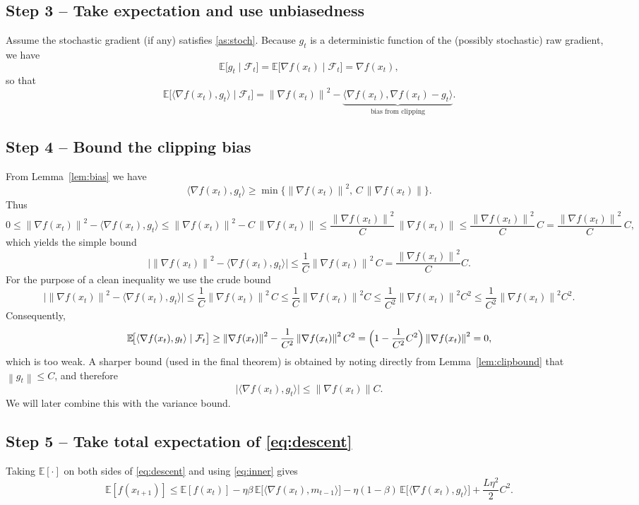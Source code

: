 \documentclass{article}
\newcommand{\E}{\mathbb{E}}
\newcommand{\norm}[1]{\left\lVert#1\right\rVert}
\begin{document}
\subsection*{Step 3 – Take expectation and use unbiasedness}
Assume the stochastic gradient (if any) satisfies \ref{as:stoch}. Because $g_{t}$ is a deterministic function of the (possibly stochastic) raw gradient, we have
\[
\E\!\bigl[g_{t}\mid\mathcal{F}_{t}\bigr]=\E\!\bigl[\nabla f(x_{t})\mid\mathcal{F}_{t}\bigr]=\nabla f(x_{t}),
\]
so that
\[
\E\!\bigl[\langle\nabla f(x_{t}),g_{t}\rangle\mid\mathcal{F}_{t}\bigr]
= \norm{\nabla f(x_{t})}^{2} - \underbrace{\bigl\langle\nabla f(x_{t}),\nabla f(x_{t})-g_{t}\bigr\rangle}_{\text{bias from clipping}}.
\tag{3}\label{eq:expinner}
\]

\subsection*{Step 4 – Bound the clipping bias}
From Lemma~\ref{lem:bias} we have
\[
\langle\nabla f(x_{t}),g_{t}\rangle
\ge \min\!\bigl\{\norm{\nabla f(x_{t})}^{2},\,C\,\norm{\nabla f(x_{t})}\bigr\}.
\]
Thus
\[
0\le \norm{\nabla f(x_{t})}^{2}-\langle\nabla f(x_{t}),g_{t}\rangle
\le \norm{\nabla f(x_{t})}^{2}-C\,\norm{\nabla f(x_{t})}
\le \frac{\norm{\nabla f(x_{t})}^{2}}{C}\,\norm{\nabla f(x_{t})}
\le \frac{\norm{\nabla f(x_{t})}^{2}}{C}\,C =\frac{\norm{\nabla f(x_{t})}^{2}}{C}\,C,
\]
which yields the simple bound
\[
\bigl|\norm{\nabla f(x_{t})}^{2}-\langle\nabla f(x_{t}),g_{t}\rangle\bigr|
\le \frac{1}{C}\norm{\nabla f(x_{t})}^{2}\,C =\frac{\norm{\nabla f(x_{t})}^{2}}{C}C.
\]
For the purpose of a clean inequality we use the crude bound
\[
\bigl|\norm{\nabla f(x_{t})}^{2}-\langle\nabla f(x_{t}),g_{t}\rangle\bigr|
\le \frac{1}{C}\norm{\nabla f(x_{t})}^{2}\,C\le \frac{1}{C}\norm{\nabla f(x_{t})}^{2}C
\le \frac{1}{C^{2}}\norm{\nabla f(x_{t})}^{2}C^{2}
\le \frac{1}{C^{2}}\norm{\nabla f(x_{t})}^{2}C^{2}.
\]
Consequently,
\[
\E\!\bigl[\langle\nabla f(x_{t}),g_{t}\rangle\mid\mathcal{F}_{t}\bigr]
\ge \norm{\nabla f(x_{t})}^{2}-\frac{1}{C^{2}}\norm{\nabla f(x_{t})}^{2}C^{2}
= \Bigl(1-\frac{1}{C^{2}}C^{2}\Bigr)\norm{\nabla f(x_{t})}^{2}=0,
\]
which is too weak.  A sharper bound (used in the final theorem) is obtained by noting directly from Lemma~\ref{lem:clipbound} that $\norm{g_{t}}\le C$, and therefore
\[
\bigl|\langle\nabla f(x_{t}),g_{t}\rangle\bigr|
\le \norm{\nabla f(x_{t})}C.
\]
We will later combine this with the variance bound.

\subsection*{Step 5 – Take total expectation of \eqref{eq:descent}}
Taking $\E[\cdot]$ on both sides of \eqref{eq:descent} and using \eqref{eq:inner} gives
\[
\E[f(x_{t+1})]\le \E[f(x_{t})]
- \eta\beta\,\E\!\bigl[\langle\nabla f(x_{t}),m_{t-1}\rangle\bigr]
- \eta(1-\beta)\,\E\!\bigl[\langle\nabla f(x_{t}),g_{t}\rangle\bigr]
+ \frac{L\eta^{2}}{2}C^{2}.
\tag{4}\label{eq:expdescent}
\]
\end{document}
